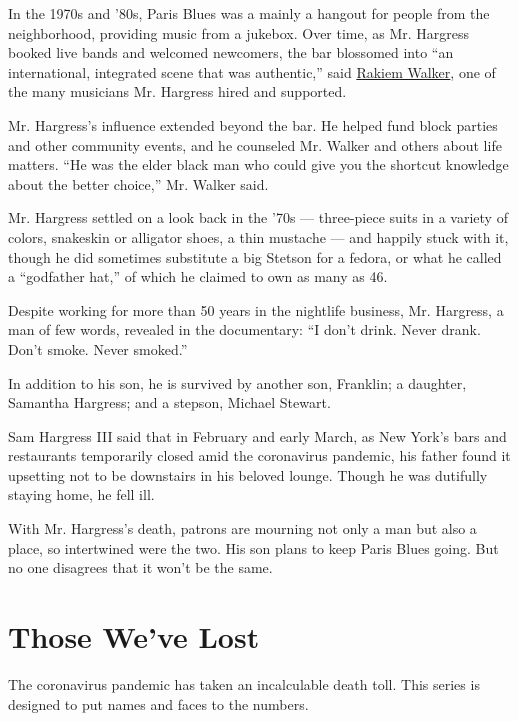 In the 1970s and '80s, Paris Blues was a mainly a hangout for people
from the neighborhood, providing music from a jukebox. Over time, as Mr.
Hargress booked live bands and welcomed newcomers, the bar blossomed
into ``an international, integrated scene that was authentic,'' said
\href{https://rakiemwalker.com/}{Rakiem Walker}, one of the many
musicians Mr. Hargress hired and supported.

Mr. Hargress's influence extended beyond the bar. He helped fund block
parties and other community events, and he counseled Mr. Walker and
others about life matters. ``He was the elder black man who could give
you the shortcut knowledge about the better choice,'' Mr. Walker said.

Mr. Hargress settled on a look back in the '70s --- three-piece suits in
a variety of colors, snakeskin or alligator shoes, a thin mustache ---
and happily stuck with it, though he did sometimes substitute a big
Stetson for a fedora, or what he called a ``godfather hat,'' of which he
claimed to own as many as 46.

Despite working for more than 50 years in the nightlife business, Mr.
Hargress, a man of few words, revealed in the documentary: ``I don't
drink. Never drank. Don't smoke. Never smoked.''

In addition to his son, he is survived by another son, Franklin; a
daughter, Samantha Hargress; and a stepson, Michael Stewart.

Sam Hargress III said that in February and early March, as New York's
bars and restaurants temporarily closed amid the coronavirus pandemic,
his father found it upsetting not to be downstairs in his beloved
lounge. Though he was dutifully staying home, he fell ill.

With Mr. Hargress's death, patrons are mourning not only a man but also
a place, so intertwined were the two. His son plans to keep Paris Blues
going. But no one disagrees that it won't be the same.

\href{https://www.nytimes.com/interactive/2020/obituaries/people-died-coronavirus-obituaries.html?action=click\&pgtype=Article\&state=default\&region=BELOW_MAIN_CONTENT\&context=covid_obits_promo}{}

\hypertarget{those-weve-lost}{%
\section{Those We've Lost}\label{those-weve-lost}}

The coronavirus pandemic has taken an incalculable death toll. This
series is designed to put names and faces to the numbers.

